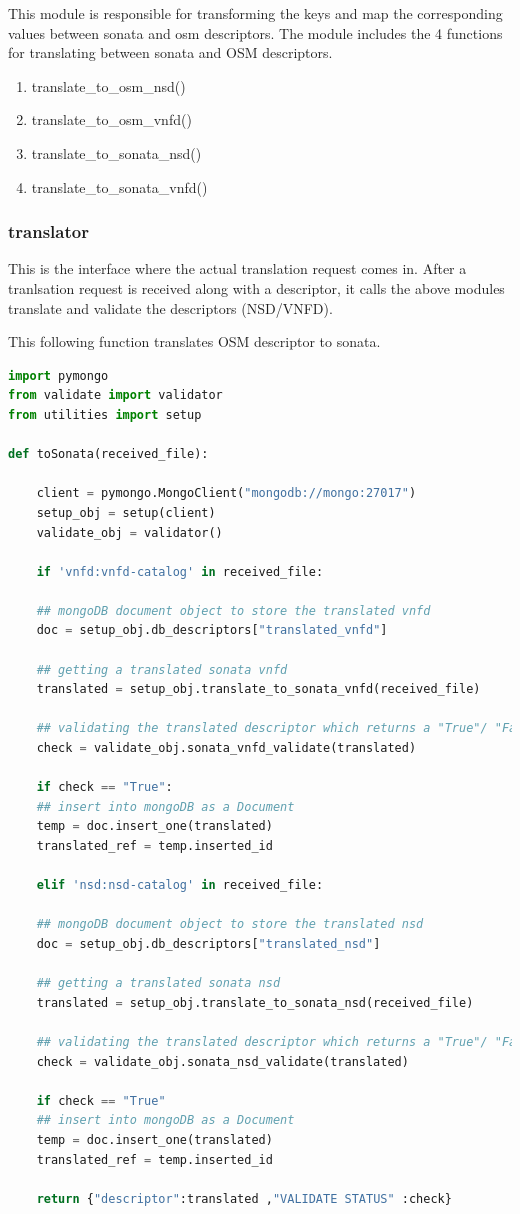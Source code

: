 This module is responsible for transforming the keys and map the corresponding values between sonata and osm descriptors. The module includes the 4 functions for translating between sonata and OSM descriptors. 
\begin{enumerate}
	\item translate\_to\_osm\_nsd()
	\item translate\_to\_osm\_vnfd()
	\item translate\_to\_sonata\_nsd()
	\item translate\_to\_sonata\_vnfd()
\end{enumerate}

\subsubsection{translator}

This is the interface where the actual translation request comes in. After a tranlsation request is received along with a descriptor, it calls the above modules translate and validate the descriptors (NSD/VNFD).

This following function translates OSM descriptor to sonata.
\begin{lstlisting}[language=Python]
import pymongo
from validate import validator
from utilities import setup

def toSonata(received_file):

	client = pymongo.MongoClient("mongodb://mongo:27017")
	setup_obj = setup(client)
	validate_obj = validator()
	
	if 'vnfd:vnfd-catalog' in received_file:
	
	## mongoDB document object to store the translated vnfd
	doc = setup_obj.db_descriptors["translated_vnfd"]
	
	## getting a translated sonata vnfd
	translated = setup_obj.translate_to_sonata_vnfd(received_file)
	
	## validating the translated descriptor which returns a "True"/ "False" string
	check = validate_obj.sonata_vnfd_validate(translated)
	
	if check == "True":
	## insert into mongoDB as a Document
	temp = doc.insert_one(translated)
	translated_ref = temp.inserted_id
	
	elif 'nsd:nsd-catalog' in received_file:
	
	## mongoDB document object to store the translated nsd
	doc = setup_obj.db_descriptors["translated_nsd"]
	
	## getting a translated sonata nsd
	translated = setup_obj.translate_to_sonata_nsd(received_file)
	
	## validating the translated descriptor which returns a "True"/ "False" string
	check = validate_obj.sonata_nsd_validate(translated)
	
	if check == "True"
	## insert into mongoDB as a Document
	temp = doc.insert_one(translated)
	translated_ref = temp.inserted_id
	
	return {"descriptor":translated ,"VALIDATE STATUS" :check}
\end{lstlisting}


